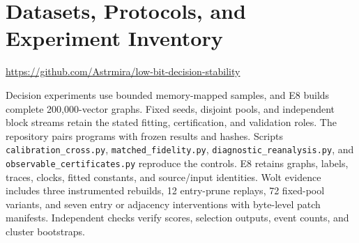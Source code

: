 \section{Datasets, Protocols, and Experiment Inventory}
\label{app:experiments}

\noindent\url{https://github.com/Astrmira/low-bit-decision-stability}


Decision experiments use bounded memory-mapped samples, and E8 builds complete 200{,}000-vector graphs. Fixed seeds, disjoint pools, and independent block streams retain the stated fitting, certification, and validation roles. The repository pairs programs with frozen results and hashes. Scripts \texttt{calibration\_cross.py}, \texttt{matched\_fidelity.py}, \texttt{diagnostic\_reanalysis.py}, and \texttt{observable\_certificates.py} reproduce the controls. E8 retains graphs, labels, traces, clocks, fitted constants, and source/input identities. Wolt evidence includes three instrumented rebuilds, 12 entry-prune replays, 72 fixed-pool variants, and seven entry or adjacency interventions with byte-level patch manifests. Independent checks verify scores, selection outputs, event counts, and cluster bootstraps.



